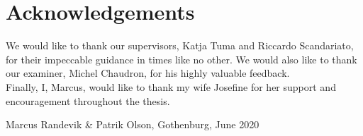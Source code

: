 \thispagestyle{plain}			%
\section*{Acknowledgements}
We would like to thank our supervisors, Katja Tuma and Riccardo Scandariato, for their impeccable guidance in times like no other. We would also like to thank our examiner, Michel Chaudron, for his highly valuable feedback.\\

Finally, I, Marcus, would like to thank my wife Josefine for her support and encouragement throughout the thesis.

\vspace{1.5cm}
\hfill
Marcus Randevik \& Patrik Olson, Gothenburg, June 2020

\newpage				%
\thispagestyle{empty}
\mbox{}